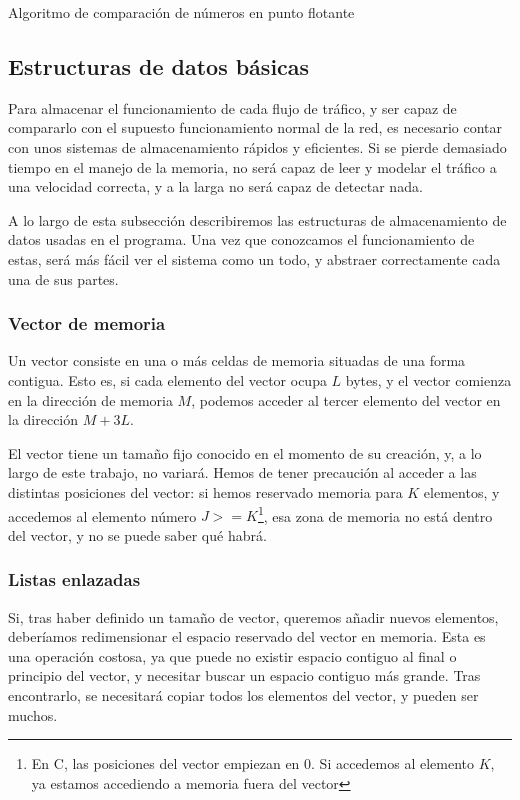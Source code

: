 \begin{algorithm}
 \caption{Algoritmo de comparación de números en punto flotante}
\end{algorithm}


\subsection{Estructuras de datos básicas}
Para almacenar el funcionamiento de cada flujo de tráfico, y ser capaz de compararlo con el supuesto funcionamiento 
normal de la red, es necesario contar con unos sistemas de almacenamiento rápidos y eficientes. Si se pierde demasiado 
tiempo en el manejo de la memoria, \redborderddos{} no será capaz de leer y modelar el tráfico a una velocidad 
correcta, y a la larga no será capaz de detectar nada.

A lo largo de esta subsección describiremos las estructuras de almacenamiento de datos usadas en el programa. Una vez 
que conozcamos el funcionamiento de estas, será más fácil ver el sistema como un todo, y abstraer correctamente cada 
una de sus partes.

\subsubsection{Vector de memoria}
Un vector consiste en una o más celdas de memoria situadas de una forma contigua. Esto es, si cada elemento del vector 
ocupa $L$ bytes, y el vector comienza en la dirección de memoria $M$, podemos acceder al tercer elemento del vector en 
la dirección $M+3L$.

El vector tiene un tamaño fijo conocido en el momento de su creación, y, a lo largo de este trabajo, no variará. Hemos 
de tener precaución al acceder a las distintas posiciones del vector: si hemos reservado memoria para $K$ elementos, y 
accedemos al elemento número $J>=K$\footnote{En C, las posiciones del vector empiezan en 0. Si accedemos al elemento 
$K$, ya estamos accediendo a memoria fuera del vector}, esa zona de memoria no está dentro del vector, y no se puede 
saber qué habrá.

\subsubsection{Listas enlazadas}
Si, tras haber definido un tamaño de vector, queremos añadir nuevos elementos, deberíamos redimensionar el espacio 
reservado del vector en memoria. Esta es una operación costosa, ya que puede no existir espacio contiguo al final o 
principio del vector, y necesitar buscar un espacio contiguo más grande. Tras encontrarlo, se necesitará copiar todos 
los elementos del vector, y pueden ser muchos.

